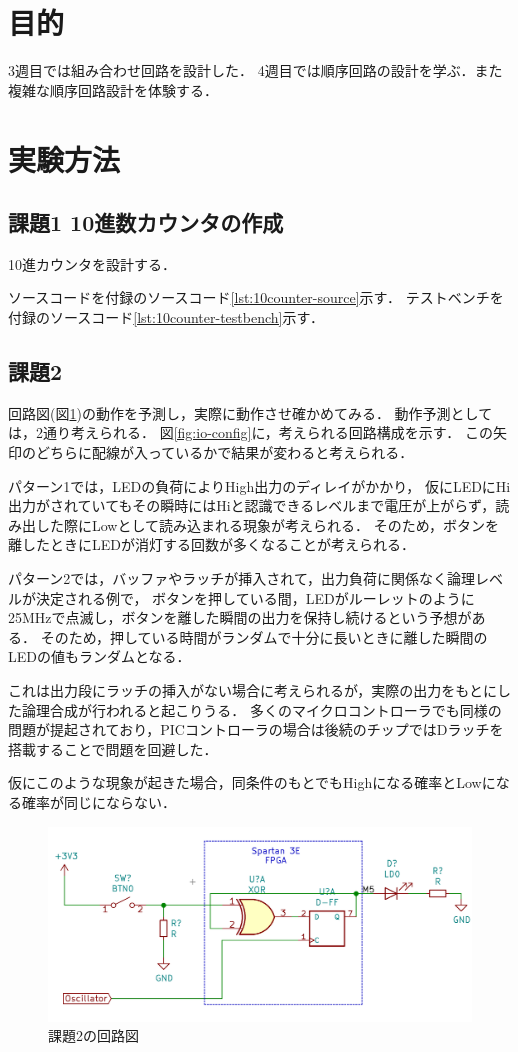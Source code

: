 \section{目的}
3週目では組み合わせ回路を設計した．
4週目では順序回路の設計を学ぶ．また複雑な順序回路設計を体験する．

\section{実験方法}
\subsection{課題1 10進数カウンタの作成}
10進カウンタを設計する．

ソースコードを付録のソースコード\ref{lst:10counter-source}示す．
テストベンチを付録のソースコード\ref{lst:10counter-testbench}示す．

\subsection{課題2}
回路図(図\ref{fig:no2-sch})の動作を予測し，実際に動作させ確かめてみる．
動作予測としては，2通り考えられる．
図\ref{fig:io-config}に，考えられる回路構成を示す．
この矢印のどちらに配線が入っているかで結果が変わると考えられる．

パターン1では，LEDの負荷によりHigh出力のディレイがかかり，
仮にLEDにHi出力がされていてもその瞬時にはHiと認識できるレベルまで電圧が上がらず，読み出した際にLowとして読み込まれる現象が考えられる．
そのため，ボタンを離したときにLEDが消灯する回数が多くなることが考えられる．

パターン2では，バッファやラッチが挿入されて，出力負荷に関係なく論理レベルが決定される例で，
ボタンを押している間，LEDがルーレットのように25MHzで点滅し，ボタンを離した瞬間の出力を保持し続けるという予想がある．
そのため，押している時間がランダムで十分に長いときに離した瞬間のLEDの値もランダムとなる．

これは出力段にラッチの挿入がない場合に考えられるが，実際の出力をもとにした論理合成が行われると起こりうる．
多くのマイクロコントローラでも同様の問題が提起されており，PICコントローラの場合は後続のチップではDラッチを搭載することで問題を回避した．

仮にこのような現象が起きた場合，同条件のもとでもHighになる確率とLowになる確率が同じにならない．
\begin{figure}[tbp]
  \includegraphics[angle=0,width=160mm]{week4/pics/no2-schematics.png}
  \centering
  \caption{課題2の回路図} %
  \label{fig:no2-sch} %
\end{figure}

